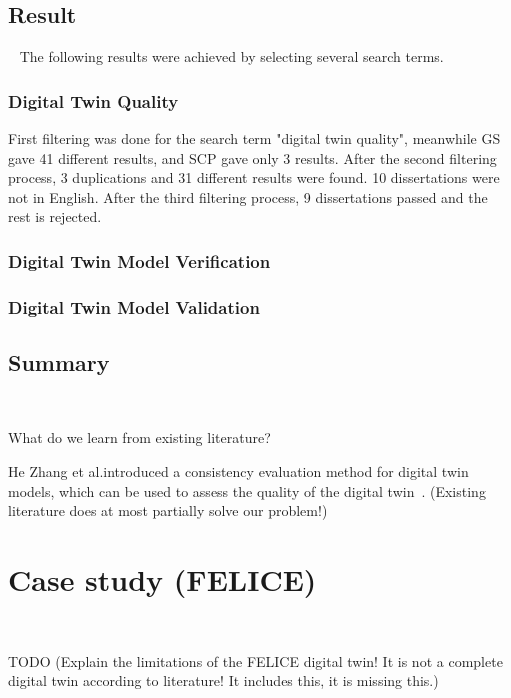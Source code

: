 \documentclass[9pt,conference]{IEEEtran}
\begin{document}
    
    \subsection{Result}~\label{section:liteature_result}
    The following results were achieved by selecting several search terms.
    \subsubsection*{Digital Twin Quality}\label{subsection:DigitalTwinQuality}
    
    First filtering was done for the search term "digital twin quality", meanwhile GS gave 41 different results, and SCP gave only 3 results.
    After the second filtering process, 3 duplications and 31 different results were found. 10 dissertations were not in English.
    After the third filtering process, 9 dissertations passed and the rest is rejected.

    


    \subsubsection*{Digital Twin Model Verification}\label{subsection:DigitalTwinVerification}

    \subsubsection*{Digital Twin Model Validation}\label{subsection:DigitalTwinValidation}

    \subsection{Summary}~\label{section:liteature_summary}

    What do we learn from existing literature?

    He Zhang et al.introduced a consistency evaluation method for digital twin models, which can be used to assess the quality of the digital twin~\cite{ConsistencyEvolutionMethodForDigitalTwins}.
    (Existing literature does at most partially solve our problem!)

    \section{Case study (FELICE)}~\label{section:case}

    TODO (Explain the limitations of the FELICE digital twin! It is not a complete digital twin according to literature! It includes this, it is missing this.)
\end{document}
